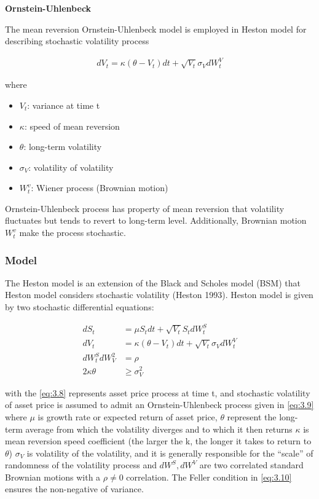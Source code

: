 \documentclass[12pt,a4paper]{article}
\numberwithin{equation}{section}
\begin{document}
\textbf{Ornstein-Uhlenbeck}

The mean reversion Ornstein-Uhlenbeck model is employed in Heston model for describing stochastic volatility process

\begin{align*}
dV_t = \kappa (\theta - V_t) dt + \sqrt{V_t} \sigma_V dW_t^V 
\end{align*}

where 
\begin{itemize}
\item $V_t$: variance at time t
\item $\kappa$: speed of mean reversion
\item $\theta$: long-term volatility
\item $\sigma_V$: volatility of volatility
\item $W_t^v$: Wiener process (Brownian motion)
\end{itemize}

Ornstein-Uhlenbeck process has property of mean reversion that volatility fluctuates but tends to revert to long-term level. Additionally, Brownian motion $W_t^v$ make the process stochastic.


\subsubsection{Model}
The Heston model is an extension of the Black and Scholes model (BSM) that Heston model considers stochastic volatility (Heston 1993). Heston model is given by two stochastic differential equations:

\begin{align}
dS_t &= \mu S_t dt + \sqrt{V_t} S_t dW_t^S \label{eq:3.8} \\[0.6em]
dV_t &= \kappa (\theta - V_t) dt + \sqrt{V_t} \sigma_V dW_t^V \label{eq:3.9} \\[0.6em]
dW_t^S dW_V^2 &= \rho \\[0.6em]
2\kappa \theta &\ge \sigma_V^2 \label{eq:3.10}
\end{align}

with the \eqref{eq:3.8} represents asset price process at time t, and stochastic volatility of asset price is assumed to admit an Ornstein-Uhlenbeck process given in \eqref{eq:3.9} where $\mu$ is growth rate or expected return of asset price, $\theta$ represent the long-term average from which the volatility diverges and to which it then returns $\kappa$ is mean reversion speed coefficient (the larger the k, the longer it takes to return to $\theta$)
$\sigma_V$ is volatility of the volatility, and it is generally responsible for the “scale” of randomness of the volatility process and $dW^S, dW^V$ are two correlated standard Brownian motions with a $\rho \neq 0$ correlation. The Feller condition in \eqref{eq:3.10} ensures the non-negative of variance.
\end{document}
